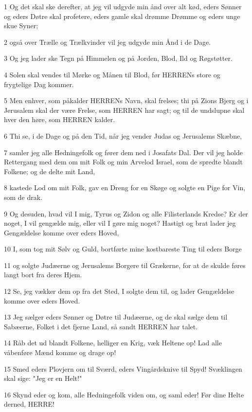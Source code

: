 \par 1 Og det skal ske derefter, at jeg vil udgyde min ånd over alt kød, eders Sønner og eders Døtre skal profetere, eders gamle skal drømme Drømme og eders unge skue Syner;
\par 2 også over Trælle og Trælkvinder vil jeg udgyde min Ånd i de Dage.
\par 3 Og jeg lader ske Tegn på Himmelen og på Jorden, Blod, Ild og Røgstøtter.
\par 4 Solen skal vendes til Mørke og Månen til Blod, før HERRENs store og frygtelige Dag kommer.
\par 5 Men enhver, som påkalder HERRENs Navn, skal frelses; thi på Zions Bjerg og i Jerusalem skal der være Frelse, som HERREN har sagt; og til de undslupne skal hver den høre, som HERREN kalder.
\par 6 Thi se, i de Dage og på den Tid, når jeg vender Judas og Jerusalems Skæbne,
\par 7 samler jeg alle Hedningefolk og fører dem ned i Josafats Dal. Der vil jeg holde Rettergang med dem om mit Folk og min Arvelod Israel, som de spredte blandt Folkene; og de delte mit Land,
\par 8 kastede Lod om mit Folk, gav en Dreng for en Skøge og solgte en Pige for Vin, som de drak.
\par 9 Og desuden, hvad vil I mig, Tyrus og Zidon og alle Filisterlands Kredse? Er der noget, I vil gengælde mig, eller vil I gøre mig noget? Hastigt og brat lader jeg Gengældelse komme over eders Hoved,
\par 10 I, som tog mit Sølv og Guld, bortførte mine kostbareste Ting til eders Borge
\par 11 og solgte Judæerne og Jerusalems Borgere til Grækerne, for at de skulde føres langt bort fra deres Hjem.
\par 12 Se, jeg vækker dem op fra det Sted, I solgte dem til, og lader Gengældelse komme over eders Hoved.
\par 13 Jeg sælger eders Sønner og Døtre til Judæerne, og de skal sælge dem til Sabæerne, Folket i det fjerne Land, så sandt HERREN har talet.
\par 14 Råb det ud blandt Folkene, helliger en Krig, væk Heltene op! Lad alle våbenføre Mænd komme og drage op!
\par 15 Smed eders Plovjern om til Sværd, eders Vingårdsknive til Spyd! Svæklingen skal sige: "Jeg er en Helt!"
\par 16 Skynd eder og kom, alle Hedningefolk viden om, og saml eder! Før dine Helte derned, HERRE!
